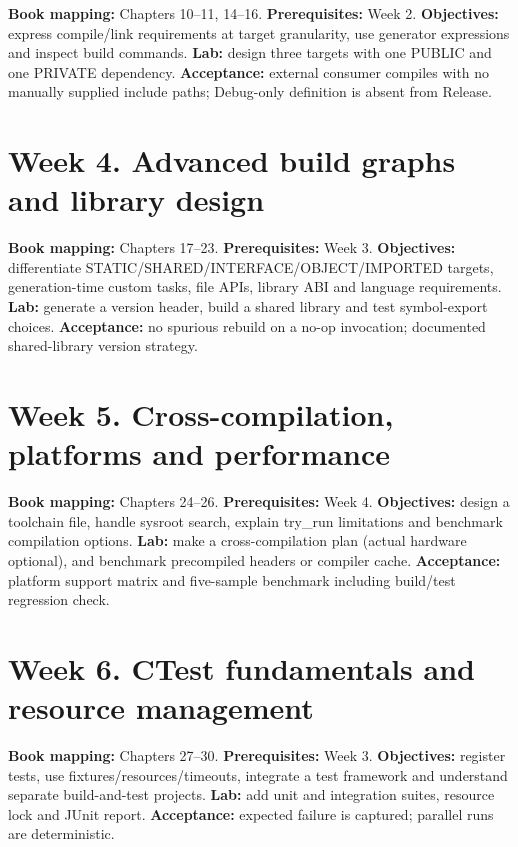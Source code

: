 \documentclass[11pt,letterpaper,oneside]{report}
\begin{document}
\textbf{Book mapping:} Chapters 10--11, 14--16. \textbf{Prerequisites:}
Week 2. \textbf{Objectives:} express compile/link requirements at target
granularity, use generator expressions and inspect build commands.
\textbf{Lab:} design three targets with one PUBLIC and one PRIVATE
dependency. \textbf{Acceptance:} external consumer compiles with no
manually supplied include paths; Debug-only definition is absent from
Release.

\section{Week 4. Advanced build graphs and library
design}\label{week-4.-advanced-build-graphs-and-library-design}

\textbf{Book mapping:} Chapters 17--23. \textbf{Prerequisites:} Week 3.
\textbf{Objectives:} differentiate
STATIC/SHARED/INTERFACE/OBJECT/IMPORTED targets, generation-time custom
tasks, file APIs, library ABI and language requirements. \textbf{Lab:}
generate a version header, build a shared library and test symbol-export
choices. \textbf{Acceptance:} no spurious rebuild on a no-op invocation;
documented shared-library version strategy.

\section{Week 5. Cross-compilation, platforms and
performance}\label{week-5.-cross-compilation-platforms-and-performance}

\textbf{Book mapping:} Chapters 24--26. \textbf{Prerequisites:} Week 4.
\textbf{Objectives:} design a toolchain file, handle sysroot search,
explain try\_run limitations and benchmark compilation options.
\textbf{Lab:} make a cross-compilation plan (actual hardware optional),
and benchmark precompiled headers or compiler cache.
\textbf{Acceptance:} platform support matrix and five-sample benchmark
including build/test regression check.

\section{Week 6. CTest fundamentals and resource
management}\label{week-6.-ctest-fundamentals-and-resource-management}

\textbf{Book mapping:} Chapters 27--30. \textbf{Prerequisites:} Week 3.
\textbf{Objectives:} register tests, use fixtures/resources/timeouts,
integrate a test framework and understand separate build-and-test
projects. \textbf{Lab:} add unit and integration suites, resource lock
and JUnit report. \textbf{Acceptance:} expected failure is captured;
parallel runs are deterministic.
\end{document}
